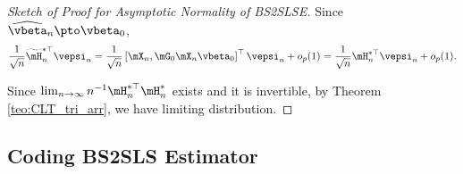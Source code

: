 \documentclass[english,12pt]{book}\usepackage[]{graphicx}\usepackage[]{xcolor}
\begin{document}
\begin{proof}[Sketch of Proof for Asymptotic Normality of BS2SLSE]
Since $\widehat{\vbeta}_n \pto \vbeta_0$, 
\begin{equation*}
\frac{1}{\sqrt{n}}\widetilde{\mH}_n^{*\top}\vepsi_n = \frac{1}{\sqrt{n}}\left[\mX_n, \mG_0\mX_n\vbeta_0\right]^\top \vepsi_n + o_p(1) = \frac{1}{\sqrt{n}}\mH_n^{*\top}\vepsi_n + o_p(1).
\end{equation*}

Since $\lim_{n\to\infty}n^{-1}\mH_n^{*\top}\mH_n^{*}$ exists and it is invertible, by Theorem \ref{teo:CLT_tri_arr}, we have limiting distribution.
\end{proof}

\subsection{Coding BS2SLS Estimator}
\end{document}
